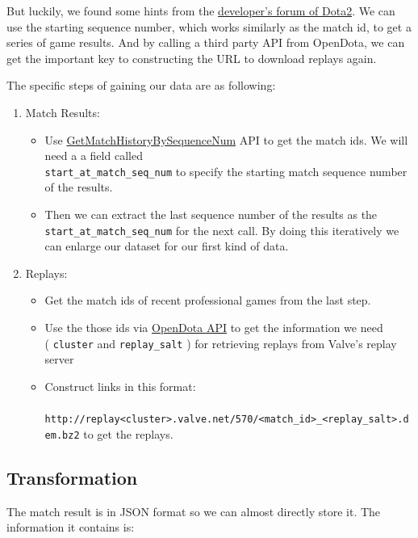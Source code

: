 \documentclass{article}
\newcommand{\codeinline}[1]{
	\texttt{#1}
}
\begin{document}
But luckily, we found some hints from the \href{https://dev.dota2.com}{developer's forum of Dota2}.
We can use the starting \gls{sequence number}, which works similarly as the \gls{match id}, to get a series of game results.
And by calling a third party API from OpenDota, we can get the important key to constructing the URL to download replays again.

The specific steps of gaining our data are as following:

\begin{enumerate}
\item Match Results:
	\begin{itemize}
		\item Use \href{https://wiki.teamfortress.com/wiki/WebAPI/GetMatchHistoryBySequenceNum}{GetMatchHistoryBySequenceNum} API to get the match ids. We will need a a field called \\ \codeinline{start_at_match_seq_num} to specify the starting match sequence number of the results.
		\item Then we can extract the last sequence number of the results as the \codeinline{start_at_match_seq_num} for the next call. By doing this iteratively we can enlarge our dataset for our first kind of data.
	\end{itemize}
\item Replays:
	\begin{itemize}
		\item Get the match ids of recent professional games from the last step.
		\item Use the those ids via \href{https://docs.opendota.com/#tag/matches}{OpenDota API} to get the information we need \\ (\codeinline{cluster} and \codeinline{replay_salt}) for retrieving replays from Valve's replay server
		\item Construct links in this format:\\  \codeinline{ http://replay<cluster>.valve.net/570/<match_id>_<replay_salt>.dem.bz2} to get the replays.
	\end{itemize}
\end{enumerate}


\subsection{Transformation}

The match result is in JSON format so we can almost directly store it. The information it contains is:
\end{document}
